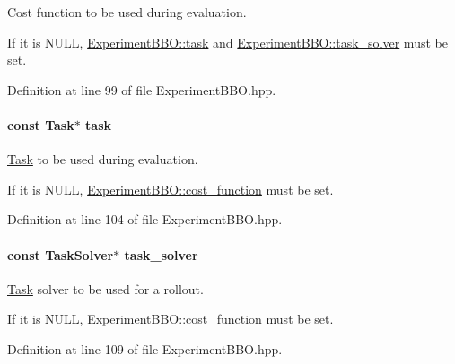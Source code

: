 Cost function to be used during evaluation. 

If it is N\+U\+L\+L, \hyperlink{classDmpBbo_1_1ExperimentBBO_a2a8fc5ed3ca237057b7b9a4d572739a3}{Experiment\+B\+B\+O\+::task} and \hyperlink{classDmpBbo_1_1ExperimentBBO_a28912fe456a83b6f10f63c64ba4bfc66}{Experiment\+B\+B\+O\+::task\+\_\+solver} must be set. 

Definition at line 99 of file Experiment\+B\+B\+O.\+hpp.

\hypertarget{classDmpBbo_1_1ExperimentBBO_a2a8fc5ed3ca237057b7b9a4d572739a3}{
\paragraph[{task}]{\setlength{\rightskip}{0pt plus 5cm}const {\bf Task}$\ast$ task}}\label{classDmpBbo_1_1ExperimentBBO_a2a8fc5ed3ca237057b7b9a4d572739a3}


\hyperlink{classDmpBbo_1_1Task}{Task} to be used during evaluation. 

If it is N\+U\+L\+L, \hyperlink{classDmpBbo_1_1ExperimentBBO_aee83479842305376e5232158fd6b1383}{Experiment\+B\+B\+O\+::cost\+\_\+function} must be set. 

Definition at line 104 of file Experiment\+B\+B\+O.\+hpp.

\hypertarget{classDmpBbo_1_1ExperimentBBO_a28912fe456a83b6f10f63c64ba4bfc66}{
\paragraph[{task\+\_\+solver}]{\setlength{\rightskip}{0pt plus 5cm}const {\bf Task\+Solver}$\ast$ task\+\_\+solver}}\label{classDmpBbo_1_1ExperimentBBO_a28912fe456a83b6f10f63c64ba4bfc66}


\hyperlink{classDmpBbo_1_1Task}{Task} solver to be used for a rollout. 

If it is N\+U\+L\+L, \hyperlink{classDmpBbo_1_1ExperimentBBO_aee83479842305376e5232158fd6b1383}{Experiment\+B\+B\+O\+::cost\+\_\+function} must be set. 

Definition at line 109 of file Experiment\+B\+B\+O.\+hpp.

